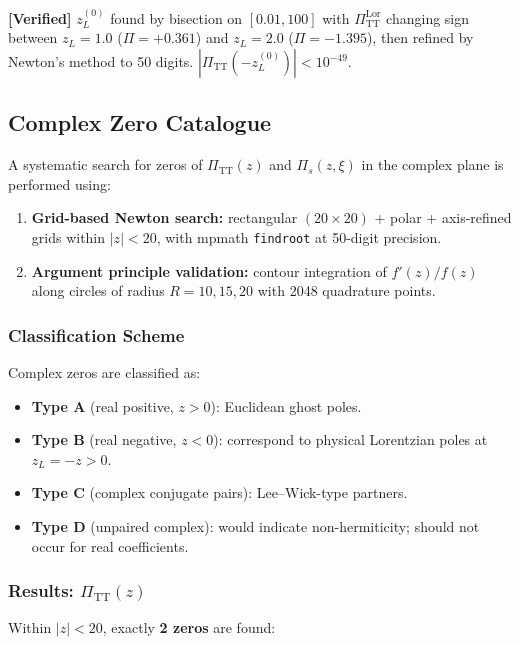 \documentclass[11pt,a4paper]{article}
\theoremstyle{definition}
\theoremstyle{remark}
\newcommand{\verified}[1]{%
  \par\smallskip\noindent
  \colorbox{green!10}{\parbox{\dimexpr\linewidth-2\fboxsep}{%
    \textcolor{green!50!black}{\textbf{[Verified]}} #1}}%
  \par\smallskip}
\begin{document}
\verified{$z_L^{(0)}$ found by bisection on $[0.01, 100]$ with
$\Pi_{\mathrm{TT}}^{\mathrm{Lor}}$ changing sign between $z_L = 1.0$
($\Pi = +0.361$) and $z_L = 2.0$ ($\Pi = -1.395$), then refined
by Newton's method to 50 digits.  $|\Pi_{\mathrm{TT}}(-z_L^{(0)})| <
10^{-49}$.}


\subsection{Complex Zero Catalogue}
\label{sec:complex-zeros}

A systematic search for zeros of $\Pi_{\mathrm{TT}}(z)$ and
$\Pi_s(z,\xi)$ in the complex plane is performed using:
\begin{enumerate}[nosep]
  \item \textbf{Grid-based Newton search:} rectangular
    $(20\times 20)$ + polar + axis-refined grids within $|z| < 20$,
    with mpmath \texttt{findroot} at 50-digit precision.
  \item \textbf{Argument principle validation:} contour integration of
    $f'(z)/f(z)$ along circles of radius $R = 10, 15, 20$ with 2048
    quadrature points.
\end{enumerate}

\subsubsection{Classification Scheme}

Complex zeros are classified as:
\begin{itemize}[nosep]
  \item \textbf{Type A} (real positive, $z > 0$): Euclidean ghost poles.
  \item \textbf{Type B} (real negative, $z < 0$): correspond to physical
    Lorentzian poles at $z_L = -z > 0$.
  \item \textbf{Type C} (complex conjugate pairs): Lee--Wick-type
    partners.
  \item \textbf{Type D} (unpaired complex): would indicate
    non-hermiticity; should not occur for real coefficients.
\end{itemize}

\subsubsection{Results: $\Pi_{\mathrm{TT}}(z)$}

Within $|z| < 20$, exactly \textbf{2 zeros} are found:
\end{document}

